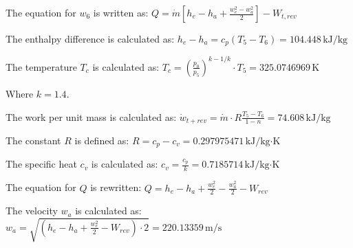 The equation for \( w_6 \) is written as:  
\( Q = \dot{m} \left[ h_e - h_a + \frac{w_e^2 - w_a^2}{2} \right] - W_{t,rev} \)  

The enthalpy difference is calculated as:  
\( h_e - h_a = c_p (T_5 - T_6) = 104.448 \, \text{kJ/kg} \)  

The temperature \( T_c \) is calculated as:  
\( T_c = \left( \frac{p_0}{p_5} \right)^{k-1/k} \cdot T_5 = 325.0746969 \, \text{K} \)  

Where \( k = 1.4 \).  

The work per unit mass is calculated as:  
\( \dot{w}_{t+rev} = \dot{m} \cdot R \frac{T_5 - T_6}{1 - n} = 74.608 \, \text{kJ/kg} \)  

The constant \( R \) is defined as:  
\( R = c_p - c_v = 0.297975471 \, \text{kJ/kg·K} \)  

The specific heat \( c_v \) is calculated as:  
\( c_v = \frac{c_p}{k} = 0.7185714 \, \text{kJ/kg·K} \)  

The equation for \( Q \) is rewritten:  
\( Q = h_e - h_a + \frac{w_e^2}{2} - \frac{w_a^2}{2} - W_{rev} \)  

The velocity \( w_a \) is calculated as:  
\( w_a = \sqrt{\left( h_e - h_a + \frac{w_e^2}{2} - W_{rev} \right) \cdot 2} = 220.13359 \, \text{m/s} \)